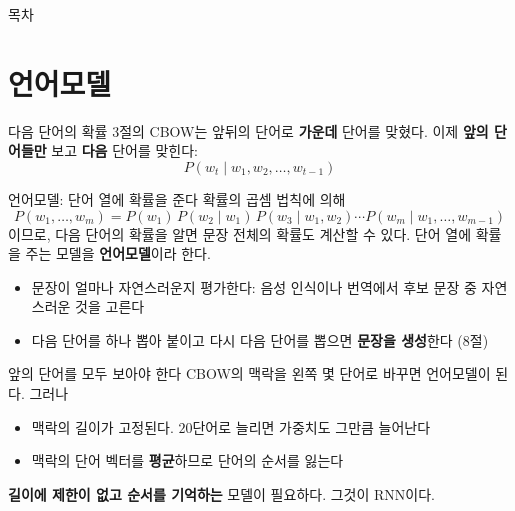 \documentclass[aspectratio=169,11pt]{beamer}
\begin{document}
\begin{frame}{목차}
\tableofcontents[firstsection=-3]
\end{frame}

\setcounter{section}{4}
\section{언어모델}

\begin{frame}{다음 단어의 확률}
3절의 CBOW는 앞뒤의 단어로 \textbf{가운데} 단어를 맞혔다.
이제 \textbf{앞의 단어들만} 보고 \textbf{다음} 단어를 맞힌다:
\[
P(w_t\mid w_1,w_2,\dots,w_{t-1})
\]
\end{frame}

\begin{frame}{언어모델: 단어 열에 확률을 준다}
확률의 곱셈 법칙에 의해
\[
P(w_1,\dots,w_m)=P(w_1)\,P(w_2\mid w_1)\,P(w_3\mid w_1,w_2)\cdots P(w_m\mid w_1,\dots,w_{m-1})
\]
이므로, 다음 단어의 확률을 알면 문장 전체의 확률도 계산할 수 있다.
단어 열에 확률을 주는 모델을 \textbf{언어모델}이라 한다.
\vskip3mm
\begin{itemize}
\item 문장이 얼마나 자연스러운지 평가한다:
음성 인식이나 번역에서 후보 문장 중 자연스러운 것을 고른다
\item 다음 단어를 하나 뽑아 붙이고 다시 다음 단어를 뽑으면 \textbf{문장을 생성}한다 (8절)
\end{itemize}
\end{frame}

\begin{frame}{앞의 단어를 모두 보아야 한다}
\vskip3mm
CBOW의 맥락을 왼쪽 몇 단어로 바꾸면 언어모델이 된다. 그러나
\begin{itemize}
\item 맥락의 길이가 고정된다. $20$단어로 늘리면 가중치도 그만큼 늘어난다
\item 맥락의 단어 벡터를 \textbf{평균}하므로 단어의 순서를 잃는다
\end{itemize}
\vskip2mm
\begin{keybox}
\textbf{길이에 제한이 없고 순서를 기억하는} 모델이 필요하다. 그것이 RNN이다.
\end{keybox}
\end{frame}
\end{document}
